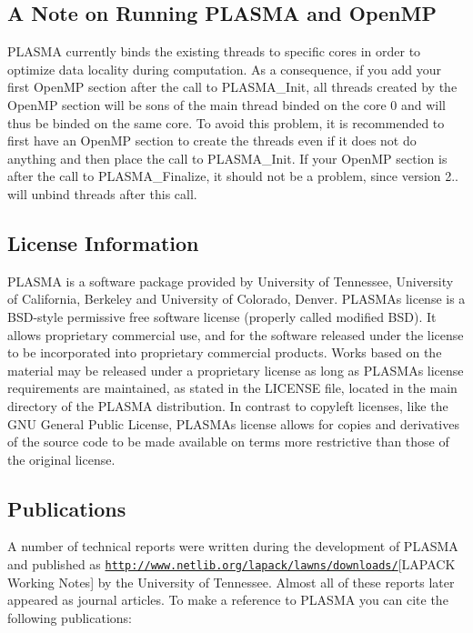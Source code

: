 \subsection*{A Note on Running P\+L\+A\+S\+M\+A and Open\+M\+P }

P\+L\+A\+S\+M\+A currently binds the existing threads to specific cores in order to optimize data locality during computation. As a consequence, if you add your first Open\+M\+P section after the call to P\+L\+A\+S\+M\+A\+\_\+\+Init, all threads created by the Open\+M\+P section will be sons of the main thread binded on the core 0 and will thus be binded on the same core. To avoid this problem, it is recommended to first have an Open\+M\+P section to create the threads even if it does not do anything and then place the call to P\+L\+A\+S\+M\+A\+\_\+\+Init. If your Open\+M\+P section is after the call to P\+L\+A\+S\+M\+A\+\_\+\+Finalize, it should not be a problem, since version 2.. will unbind threads after this call.

\subsection*{License Information }

P\+L\+A\+S\+M\+A is a software package provided by University of Tennessee, University of California, Berkeley and University of Colorado, Denver. P\+L\+A\+S\+M\+A\textquotesingle{}s license is a B\+S\+D-\/style permissive free software license (properly called modified B\+S\+D). It allows proprietary commercial use, and for the software released under the license to be incorporated into proprietary commercial products. Works based on the material may be released under a proprietary license as long as P\+L\+A\+S\+M\+A\textquotesingle{}s license requirements are maintained, as stated in the L\+I\+C\+E\+N\+S\+E file, located in the main directory of the P\+L\+A\+S\+M\+A distribution. In contrast to copyleft licenses, like the G\+N\+U General Public License, P\+L\+A\+S\+M\+A\textquotesingle{}s license allows for copies and derivatives of the source code to be made available on terms more restrictive than those of the original license.

\subsection*{Publications }

A number of technical reports were written during the development of P\+L\+A\+S\+M\+A and published as \href{http://www.netlib.org/lapack/lawns/downloads/}{\tt http\+://www.\+netlib.\+org/lapack/lawns/downloads/}\mbox{[}L\+A\+P\+A\+C\+K Working Notes\mbox{]} by the University of Tennessee. Almost all of these reports later appeared as journal articles. To make a reference to P\+L\+A\+S\+M\+A you can cite the following publications\+:


